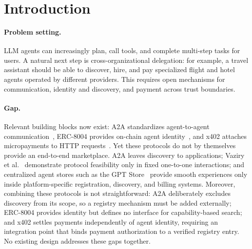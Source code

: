 \documentclass[sigconf]{acmart}
\begin{document}


\maketitle

\section{Introduction}
\label{sec:introduction}

\paragraph{Problem setting.}
LLM agents can increasingly plan, call tools, and complete multi-step
tasks for users. A natural next step is cross-organizational delegation:
for example, a travel assistant should be able to discover, hire, and
pay specialized flight and hotel agents operated by different providers.
This requires open mechanisms for communication, identity and discovery,
and payment across trust boundaries.

\paragraph{Gap.}
Relevant building blocks now exist: A2A standardizes agent-to-agent
communication~\cite{a2a2025}, ERC-8004 provides on-chain agent
identity~\cite{erc8004}, and x402 attaches micropayments to HTTP
requests~\cite{x402whitepaper}. Yet these protocols do not by themselves
provide an end-to-end marketplace. A2A leaves discovery to applications;
Vaziry et al.~\cite{vaziry2025} demonstrate protocol feasibility only in
fixed one-to-one interactions; and centralized agent stores such as the
GPT Store~\cite{gptstore} provide smooth experiences only inside
platform-specific registration, discovery, and billing systems.
Moreover, combining these protocols is not straightforward: A2A
deliberately excludes discovery from its scope, so a registry mechanism
must be added externally; ERC-8004 provides identity but defines no
interface for capability-based search; and x402 settles payments
independently of agent identity, requiring an integration point that
binds payment authorization to a verified registry entry. No existing
design addresses these gaps together.
\end{document}
